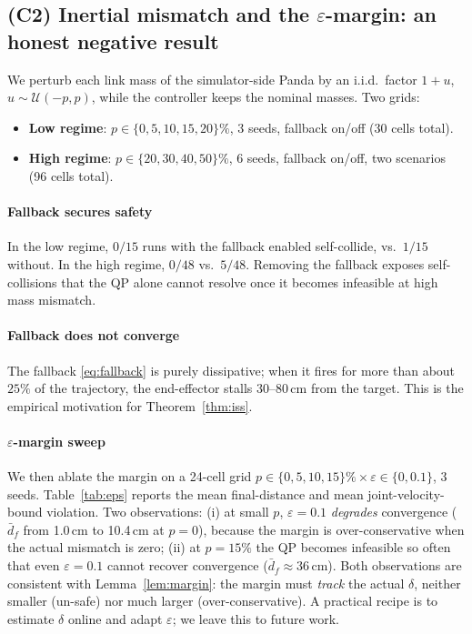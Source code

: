 \documentclass[10pt,conference]{IEEEtran}
\theoremstyle{remark}
\theoremstyle{plain}
\begin{document}
\subsection{(C2) Inertial mismatch and the
$\varepsilon$-margin: an honest negative result}
\label{sec:exp-fallback}

We perturb each link mass of the simulator-side Panda by an i.i.d.\
factor $1{+}u$, $u\!\sim\!\mathcal U(-p,p)$, while the controller
keeps the nominal masses. Two grids:
\begin{itemize}
    \item \textbf{Low regime}: $p\in\{0,5,10,15,20\}\%$,
        $3$ seeds, fallback on/off (30 cells total).
    \item \textbf{High regime}: $p\in\{20,30,40,50\}\%$,
        $6$ seeds, fallback on/off, two scenarios (96 cells
        total).
\end{itemize}

\paragraph*{Fallback secures safety} In the low regime,
$0/15$ runs with the fallback enabled self-collide, vs.\ $1/15$
without. In the high regime, $0/48$ vs.\ $5/48$. Removing the
fallback exposes self-collisions that the QP alone cannot resolve
once it becomes infeasible at high mass mismatch.

\paragraph*{Fallback does not converge} The fallback
\eqref{eq:fallback} is purely dissipative; when it fires for more
than about $25\%$ of the trajectory, the end-effector stalls
$30$--$80$\,cm from the target. This is the empirical motivation
for Theorem~\ref{thm:iss}.

\paragraph*{$\varepsilon$-margin sweep} We then ablate the
margin on a 24-cell grid $p\in\{0,5,10,15\}\%\times
\varepsilon\in\{0,0.1\}$, $3$ seeds.
Table~\ref{tab:eps} reports the mean final-distance and mean
joint-velocity-bound violation. Two observations:
(i) at small $p$, $\varepsilon{=}0.1$ \emph{degrades} convergence
($\bar d_f$ from 1.0\,cm to 10.4\,cm at $p{=}0$), because the
margin is over-conservative when the actual mismatch is zero;
(ii) at $p{=}15\%$ the QP becomes infeasible so often that even
$\varepsilon{=}0.1$ cannot recover convergence
($\bar d_f \approx 36$\,cm). Both observations are consistent
with Lemma~\ref{lem:margin}: the margin must \emph{track} the
actual $\delta$, neither smaller (un-safe) nor much larger
(over-conservative).
A practical recipe is to estimate $\delta$ online and adapt
$\varepsilon$; we leave this to future work.
\end{document}

